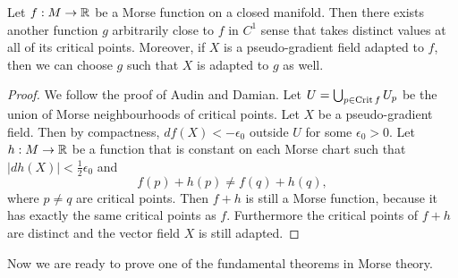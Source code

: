 \begin{prop}
    Let $f: M \to  \mathbb{R}$ be a Morse function on a closed manifold.
    Then there exists another function $g$ arbitrarily close to $f$ in $C^{1}$ sense that takes distinct values at all of its critical points.
    Moreover, if $X$ is a pseudo-gradient field adapted to  $f$,
    then we can choose $g$ such that $X$ is adapted to $g$ as well.
\end{prop}
\begin{proof}
    We follow the proof of Audin and Damian.
    Let $U = \bigcup_{p \in \operatorname{Crit} f} U_p$ be the union of Morse neighbourhoods of critical points.
    Let $X$ be a pseudo-gradient field.
    Then by compactness, $df(X) < - \epsilon_0$ outside $U$ for some $\epsilon_0>0$.
    Let $h: M \to  \mathbb{R}$ be a function that is constant on each Morse chart such that $|dh(X)| < \frac{1}{2}\epsilon_0$ and
    \[
        f(p) + h(p) \neq f(q) + h(q), 
    \] 
    where $p \neq q$ are critical points.
    Then $f+h$ is still a Morse function, because it has exactly the same critical points as $f$.
    Furthermore the critical points of $f + h$ are distinct and the vector field $X$ is still adapted.
\end{proof}

Now we are ready to prove one of the fundamental theorems in Morse theory.


